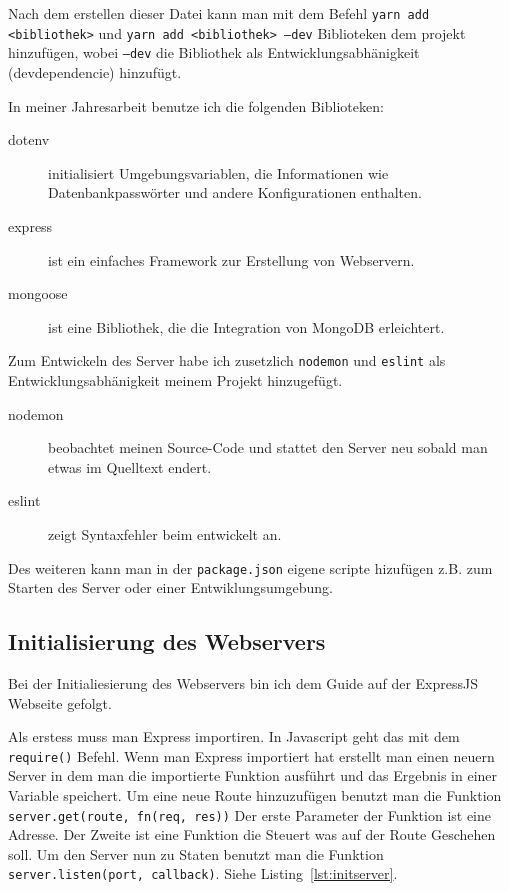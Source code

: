 \documentclass[a4paper, ngerman, 12pt]{scrartcl}
\newcommand{\js}[1]{\texttt{#1}}
\begin{document}
Nach dem erstellen dieser Datei kann man mit dem Befehl \texttt{yarn add <bibliothek>} und \texttt{yarn add <bibliothek> --dev} Biblioteken dem projekt hinzufügen, wobei \texttt{--dev} die Bibliothek als Entwicklungsabhänigkeit (devdependencie) hinzufügt.

In meiner Jahresarbeit benutze ich die folgenden Biblioteken:

\begin{description}
	\item[dotenv] initialisiert Umgebungsvariablen, die Informationen wie Datenbankpasswörter und andere Konfigurationen enthalten.
	\item[express] ist ein einfaches Framework zur Erstellung von Webservern.
	\item[mongoose] ist eine Bibliothek, die die Integration von MongoDB erleichtert.
\end{description}

Zum Entwickeln des Server habe ich zusetzlich \texttt{nodemon} und \texttt{eslint} als Entwicklungsabhänigkeit meinem Projekt hinzugefügt.

\begin{description}
	\item[nodemon] beobachtet meinen Source-Code und stattet den Server neu sobald man etwas im Quelltext endert.
	\item[eslint] zeigt Syntaxfehler beim entwickelt an.
\end{description}

Des weiteren kann man in der \texttt{package.json} eigene scripte hizufügen z.B. zum Starten des Server oder einer Entwiklungsumgebung.

\subsection{Initialisierung des Webservers} %

Bei der Initialiesierung des Webservers bin ich dem Guide auf der ExpressJS Webseite gefolgt.\autocite{Expressjs}

Als erstess muss man Express importiren. In Javascript geht das mit dem \js{require()} Befehl.
Wenn man Express importiert hat erstellt man einen neuern Server in dem man die importierte Funktion ausführt und das Ergebnis in einer Variable speichert.
Um eine neue Route hinzuzufügen benutzt man die Funktion \js{server.get(route, fn(req, res))}
Der erste Parameter der Funktion ist eine Adresse. Der Zweite ist eine Funktion die Steuert was auf der Route Geschehen soll.
Um den Server nun zu Staten benutzt man die Funktion \js{server.listen(port, callback)}.
Siehe Listing~\ref{lst:initserver}.
\end{document}
